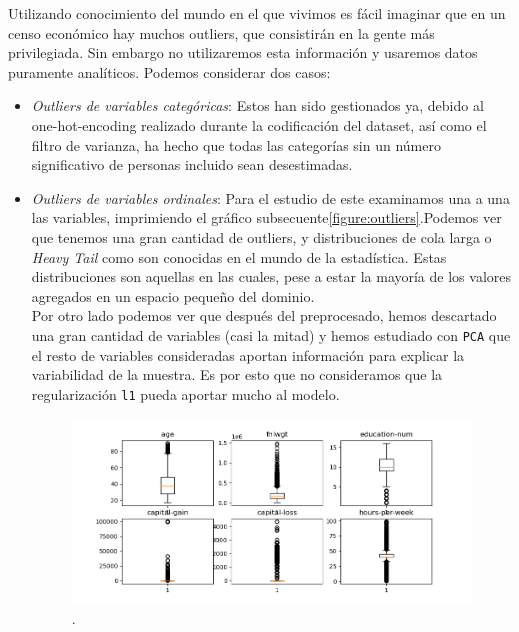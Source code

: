 \documentclass[11pt,a4paper]{article}
\begin{document}
\begin{itemize}
  Utilizando conocimiento del mundo en el que vivimos es fácil imaginar que en un censo económico hay muchos outliers, que consistirán en la gente más privilegiada. Sin embargo no utilizaremos esta información y usaremos datos puramente analíticos. Podemos considerar dos casos:
  \begin{itemize}
  \item \emph{Outliers de variables categóricas}: Estos han sido gestionados ya, debido al one-hot-encoding realizado durante la codificación del dataset, así como el filtro de varianza, ha hecho que todas las categorías sin un número significativo de personas incluido sean desestimadas.
  \item \emph{Outliers de variables ordinales}: Para el estudio de este examinamos una a una las variables, imprimiendo el gráfico subsecuente\ref{figure:outliers}.Podemos ver que tenemos una gran cantidad de outliers, y distribuciones de cola larga o \emph{Heavy Tail} como son conocidas en el mundo de la estadística. Estas distribuciones son aquellas en las cuales, pese a estar la mayoría de los valores agregados en un espacio pequeño del dominio.\\

    Por otro lado podemos ver que después del preprocesado, hemos descartado una gran cantidad de variables (casi la mitad) y hemos estudiado con \texttt{PCA} que el resto de variables consideradas aportan información para explicar la variabilidad de la muestra. Es por esto que no consideramos que la regularización \texttt{l1} pueda aportar mucho al modelo.\newpage

    \begin{figure}[h!]
      \label{figure:outliers}
      \centering
      \includegraphics[width=\textwidth]{./figures/outliers.png}
      \caption{.}
      \label{fig:outliers}
    \end{figure}

  \end{itemize}


\end{itemize}
\end{document}
